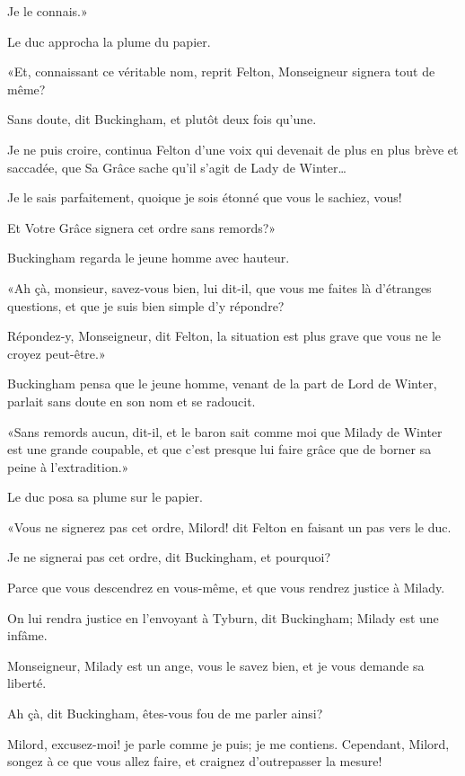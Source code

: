 \speak  Je le connais.» 

Le duc approcha la plume du papier. 

«Et, connaissant ce véritable nom, reprit Felton, Monseigneur signera tout de même? 

\speak  Sans doute, dit Buckingham, et plutôt deux fois qu'une. 

\speak  Je ne puis croire, continua Felton d'une voix qui devenait de plus en plus brève et saccadée, que Sa Grâce sache qu'il s'agit de Lady de Winter\dots 

\speak  Je le sais parfaitement, quoique je sois étonné que vous le sachiez, vous! 

\speak  Et Votre Grâce signera cet ordre sans remords?» 

Buckingham regarda le jeune homme avec hauteur. 

«Ah çà, monsieur, savez-vous bien, lui dit-il, que vous me faites là d'étranges questions, et que je suis bien simple d'y répondre? 

\speak  Répondez-y, Monseigneur, dit Felton, la situation est plus grave que vous ne le croyez peut-être.» 

Buckingham pensa que le jeune homme, venant de la part de Lord de Winter, parlait sans doute en son nom et se radoucit. 

«Sans remords aucun, dit-il, et le baron sait comme moi que Milady de Winter est une grande coupable, et que c'est presque lui faire grâce que de borner sa peine à l'extradition.» 

Le duc posa sa plume sur le papier. 

«Vous ne signerez pas cet ordre, Milord! dit Felton en faisant un pas vers le duc. 

\speak  Je ne signerai pas cet ordre, dit Buckingham, et pourquoi? 

\speak  Parce que vous descendrez en vous-même, et que vous rendrez justice à Milady. 

\speak  On lui rendra justice en l'envoyant à Tyburn, dit Buckingham; Milady est une infâme. 

\speak  Monseigneur, Milady est un ange, vous le savez bien, et je vous demande sa liberté. 

\speak  Ah çà, dit Buckingham, êtes-vous fou de me parler ainsi? 

\speak  Milord, excusez-moi! je parle comme je puis; je me contiens. Cependant, Milord, songez à ce que vous allez faire, et craignez d'outrepasser la mesure! 

